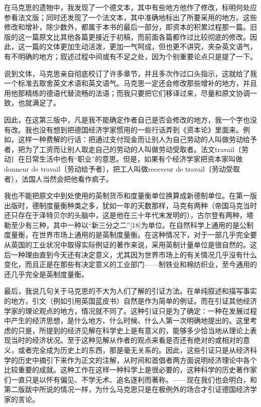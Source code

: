 \documentclass{ctexbook}
\begin{document}
在马克思的遗物中，我发现了一个德文本，其中有些地方他作了修改，标明何处应参看法文版；同时还发现了一个法文本，其中准确地标出了所要采用的地方。这些修改和增补，除少数外，都属于本书的最后一部分，即资本的积累过程那一篇。旧版的这一篇原文比其他各篇更接近于初稿，而前面各篇都作过比较彻底的修改。因此，这一篇的文体更加生动活泼，更加一气呵成，但也更不讲究，夹杂英文语气，有不明确的地方；叙述过程中间或有不足之处，因为个别重要论点只是提了一下。

说到文体，马克思亲自彻底校订了许多章节，并且多次作过口头指示，这就给了我一个标准去取舍英文术语和英文语气。马克思一定还会修改那些增补的地方，并且用他那精练的德语代替流畅的法语；而我只要把它们移译过来，尽量和原文协调一致，也就满足了。

因此，在这第三版中，凡是我不能确定作者自己是否会修改的地方，我一个字也没有改。我也没有想到把德国经济学家惯用的一些行话弄到《资本论》里面来。例如，这样一种费解的行话：把通过支付现金而让别人为自己劳动的人叫做劳动给予者，把为了工资而让别人取走自己的劳动的人叫做劳动受取者。法文travail〔劳动〕在日常生活中也有“职业”的意思。但是，如果有个经济学家把资本家叫做donneur de travail〔劳动给予者〕，把工人叫做receveur de travail〔劳动受取者〕，法国人当然会把他看作疯子。

我也不能把原文中到处使用的英制货币和度量衡单位换算成新德制单位。在第一版出版时，德制度量衡种类之多，犹如一年的天数那样，马克有两种（帝国马克当时还只存在于泽特贝尔的头脑中，这是他在三十年代末发明的），古尔登有两种，塔勒至少有三种，其中一种以“新三分之二”[18]为单位。在自然科学上通用的是公制度量衡，在世界市场上通用的是英制度量衡。在这种情况下，对于一部几乎完全要从英国的工业状况中取得实际例证的著作来说，采用英制计量单位是很自然的。这后一种理由直到今天还有决定意义，尤其因为世界市场上的有关情况几乎没有什么变化，而且正是在那些有决定意义的工业部门——制铁业和棉纺织业，至今通用的还几乎完全是英制度量衡。

最后，我说几句关于马克思的不大为人们了解的引证方法。在单纯叙述和描写事实的地方，引文（例如引用英国蓝皮书）自然是作为简单的例证。而在引证其他经济学家的理论观点的地方，情况就不同了。这种引证只是为了确定：一种在发展过程中产生的经济思想，是什么地方、什么时候、什么人第一次明确地提出的。这里考虑的只是，所提到的经济见解在科学史上是有意义的，能够多少恰当地从理论上表现当时的经济状况。至于这种见解从作者的观点来看是否还有绝对的或相对的意义，或者完全成为历史上的东西，那是毫无关系的。因此，这些引证只是从经济科学的历史中摘引下来作为正文的注解，从时间和首倡者两方面说明经济理论中各个比较重要的成就。这种工作在这样一种科学上是很必要的，这种科学的历史著作家们一直只是以怀有偏见、不学无术、追名逐利而著称。——现在我们也会明白，和第二版跋中所说的情况一样，为什么马克思只是在极例外的场合才引证德国经济学家的言论。
\end{document}
